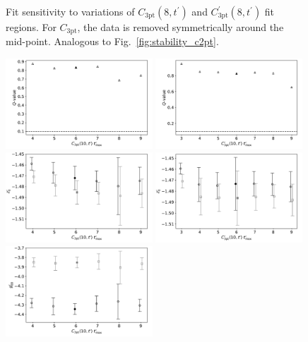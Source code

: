 \documentclass[prd,aps,twocolumn,superscriptaddress,tightenlines,nofootinbib,floatfix,preprintnumbers,10pt]{revtex4-1}
\begin{document}
\begin{figure}[h]
{		\caption{
			Fit sensitivity to variations of $C_{\mathrm{3pt}}(8,t^\prime)$ and $C^\prime_{\mathrm{3pt}}(8,t^\prime)$ fit regions. For $C_{\mathrm{3pt}}$, the data is removed symmetrically around the mid-point. Analogous to Fig.~\ref{fig:stability_c2pt}.}
		\label{fig:stability_c3pt8}
}\end{figure}

\newpage
\begin{figure}[h]{
		\includegraphics[width=0.49\textwidth]{plots/figures/3296_gV10_tmax_Q.pdf}
		\includegraphics[width=0.49\textwidth]{plots/figures/3296_dgV10_tmax_Q.pdf}
		\includegraphics[width=0.49\textwidth]{plots/figures/3296_gV10_tmax_dZ0.pdf}
		\includegraphics[width=0.49\textwidth]{plots/figures/3296_dgV10_tmax_dZ0.pdf}
		\includegraphics[width=0.49\textwidth]{plots/figures/3296_gV10_tmax_dgV.pdf}
}
\end{figure}
\end{document}
